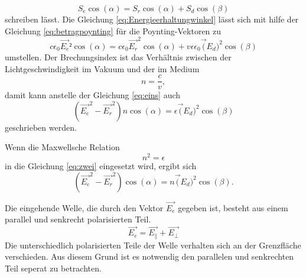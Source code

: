 \begin{equation}
    S_e \cos(\alpha) = S_r \cos(\alpha) +  S_d \cos(\beta)
    \label{eq:Energieerhaltungwinkel}
\end{equation}
schreiben lässt.
Die Gleichung \eqref{eq:Energieerhaltungwinkel} lässt sich mit hilfe der Gleichung \eqref{eq:betragpoynting} für die Poynting-Vektoren zu 
\begin{equation}
    c \epsilon_0 \vec{E_e}² \cos(\alpha) = c \epsilon_0 \vec{E_r}^2 \cos(\alpha) + v \epsilon \epsilon_0 \vec(E_d)^2 \cos(\beta)
    \label{eq:eins}
\end{equation}
umstellen. Der Brechungsindex ist das Verhältnis zwischen der Lichtgeschwindigkeit im Vakuum und der im Medium 
\begin{equation}
    n = \dfrac{c}{v} ,
    \label{eq:Brechungsindex}
\end{equation}
damit kann anstelle der Gleichung \eqref{eq:eins} auch 
\begin{equation}
    (\vec{E_e}^2  - \vec{E_r}^2)n \cos(\alpha) = \epsilon \vec(E_d)^2 \cos(\beta)
    \label{eq:zwei}
\end{equation}
geschrieben werden.

Wenn die Maxwellsche Relation
\begin{equation*}
    n^2 = \epsilon
    \label{eq:Maxwellschrelation}
\end{equation*}
in die Gleichung \eqref{eq:zwei} eingesetzt wird, ergibt sich 
\begin{equation}
    (\vec{E_e}^2  - \vec{E_r}^2) \cos(\alpha) = n \vec(E_d)^2 \cos(\beta).
    \label{eq:drei}
\end{equation}

Die eingehende Welle, die durch den Vektor $\vec{E_e}$ gegeben ist, besteht aus einem parallel und senkrecht polarisierten Teil.
\begin{equation*}
    \vec{E_e} = \vec{E_\parallel}  + \vec{E_\perp}
    \label{eq:vier}
\end{equation*}
Die unterschiedlich polarisierten Teile der Welle verhalten sich an der Grenzfläche verschieden.
Aus diesem Grund ist es notwendig den parallelen und senkrechten Teil seperat zu betrachten. 
